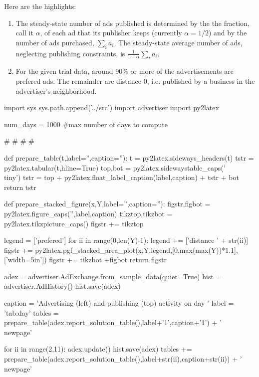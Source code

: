 \documentclass[letterpaper,10pt]{article}
\begin{document}
Here are the highlights:
\begin{enumerate}
\item The steady-state number of ads published is determined by the the fraction, call it $\alpha$, of each ad that its publisher keeps (currently $\alpha = 1/2$) and by the number of ads purchased, $\sum_{i}a_i$.  The steady-state average number of ads, neglecting publishing constraints, is $\frac{1}{1-\alpha}\sum_{i}a_i$.
\item For the given trial data, around 90\% or more of the advertisements are prefered ads.  The remainder are distance 0, i.e. published by a business in the advertiser's neighborhood.
\end{enumerate}

\begin{python}
import sys
sys.path.append('../src')
import advertiser
import py2latex

num_days = 1000 #max number of days to compute

#%
#%
#%
#%

def prepare_table(t,label='',caption=''):
    t = py2latex.sideways_headers(t)
    tstr = py2latex.tabular(t,hline=True)
    top,bot = py2latex.sidewaystable_caps('\\tiny')
    tstr = top + py2latex.float_label_caption(label,caption) + tstr + bot
    return tstr

def prepare_stacked_figure(x,Y,label='',caption=''):
    figstr,figbot = py2latex.figure_caps('',label,caption)
    tikztop,tikzbot = py2latex.tikzpicture_caps()
    figstr += tikztop

    legend = ['prefered']
    for ii in range(0,len(Y)-1):
        legend += ['distance ' + str(ii)]
    figstr += py2latex.pgf_stacked_area_plot(x,Y,legend,[0,max(max(Y))*1.1],['width=5in'])
    figstr += tikzbot +figbot
    return figstr

adex = advertiser.AdExchange.from_sample_data(quiet=True)
hist = advertiser.AdHistory()
hist.save(adex)

caption = 'Advertising (left) and publishing (top) activity on day '
label = 'tab:day'
tables = prepare_table(adex.report_solution_table(),label+'1',caption+'1') + '\n\\newpage\n'

for ii in range(2,11):
    adex.update()
    hist.save(adex)
    tables += prepare_table(adex.report_solution_table(),label+str(ii),caption+str(ii)) + '\n\\newpage\n'


\end{python}
\end{document}
